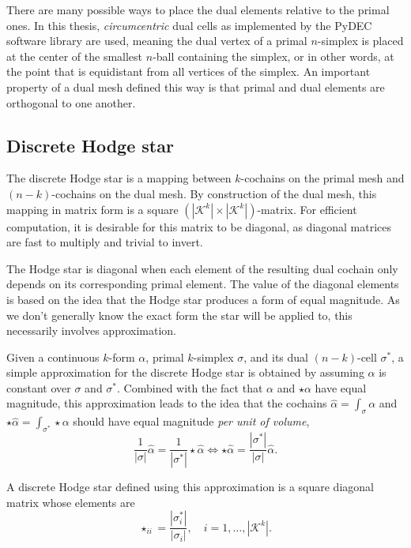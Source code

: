 \documentclass[utf8,english]{gradu3}
\begin{document}
There are many possible ways to place the dual elements relative to the primal ones.
In this thesis, \textit{circumcentric} dual cells 
as implemented by the PyDEC software library \parencite{bell_pydec_2012} are used,
meaning the dual vertex of a primal $n$-simplex
is placed at the center of the smallest $n$-ball containing the simplex,
or in other words, at the point that is equidistant from
all vertices of the simplex.
An important property of a dual mesh defined this way is
that primal and dual elements are orthogonal to one another.

\subsection{Discrete Hodge star}\label{sec:discrete_hodge}

The discrete Hodge star is a mapping between $k$-cochains on the primal mesh
and $(n-k)$-cochains on the dual mesh.
By construction of the dual mesh,
this mapping in matrix form is a square $(|\mathcal{K}^k| \times |\mathcal{K}^k|)$-matrix.
For efficient computation, it is desirable for this matrix to be diagonal,
as diagonal matrices are fast to multiply and trivial to invert.

The Hodge star is diagonal when each element of the resulting dual cochain
only depends on its corresponding primal element.
The value of the diagonal elements is based on the idea
that the Hodge star produces a form of equal magnitude.
As we don't generally know the exact form the star will be applied to,
this necessarily involves approximation.

Given a continuous $k$-form $\alpha$, primal $k$-simplex $\sigma$,
and its dual $(n-k)$-cell $\sigma^*$,
a simple approximation for the discrete Hodge star
is obtained by assuming $\alpha$ is constant over $\sigma$ and $\sigma^*$.
Combined with the fact that $\alpha$ and $\star\alpha$ have equal magnitude,
this approximation leads to the idea that the cochains
$\widehat{\alpha} = \int_{\sigma} \alpha$ and $\star\widehat{\alpha} = \int_{\sigma^*} \star\alpha$
should have equal magnitude \textit{per unit of volume},
\[
  \frac{1}{|\sigma|} \widehat{\alpha} = \frac{1}{|\sigma^*|} \star\widehat{\alpha}
  \iff \star\widehat{\alpha} = \frac{|\sigma^*|}{|\sigma|} \widehat{\alpha}.
\]

A discrete Hodge star defined using this approximation
is a square diagonal matrix whose elements are
\begin{equation}
  \star_{ii} = \frac{|\sigma_i^*|}{|\sigma_i|}, \quad i = 1, \dots, |\mathcal{K}^k|.
\end{equation}
\end{document}
